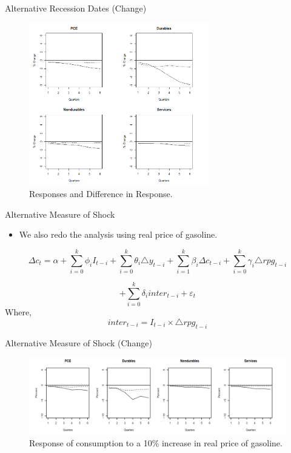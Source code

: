 \documentclass[
  10pt,
  ignorenonframetext,
]{beamer}
\providecommand{\tightlist}{%
  \setlength{\itemsep}{0pt}\setlength{\parskip}{0pt}}
\begin{document}
\begin{frame}{Alternative Recession Dates (Change)}
\protect\hypertarget{alternative-recession-dates-change}{}

\begin{figure}
\centering
\includegraphics[width=0.7\textwidth,height=\textheight]{Hamilton.png}
\caption{Responses and Difference in Response.}
\end{figure}

\end{frame}

\begin{frame}{Alternative Measure of Shock}
\protect\hypertarget{alternative-measure-of-shock}{}

\begin{itemize}
\tightlist
\item
  We also redo the analysis using real price of gasoline.
\end{itemize}

\[\Delta c_{t}=\alpha+ \sum_{i=0}^{k}\phi_{i}I_{t-i}+\sum_{i=0}^{k}\theta_{i}\triangle y_{t-i}+\sum_{i=1}^{k}\beta_{i}\Delta c_{t-i}+\sum_{i=0}^{k}\gamma_{i}\triangle rpg_{t-i}\]

\[+\sum_{i=0}^{k}\delta_{i}inter_{t-i}+\varepsilon_t\] Where,
\[inter_{t-i}=I_{t-i} \times \triangle rpg_{t-i}\]

\end{frame}

\begin{frame}{Alternative Measure of Shock (Change)}
\protect\hypertarget{alternative-measure-of-shock-change}{}

\begin{figure}
\centering
\includegraphics{RPG.jpg}
\caption{Response of consumption to a 10\% increase in real price of
gasoline.}
\end{figure}

\end{frame}
\end{document}
